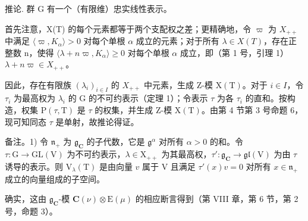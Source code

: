推论. 群 G 有一个（有限维）忠实线性表示。

首先注意，X(T) 的每个元素都等于两个支配权之差；更精确地，令 \(\varpi\) 为 \(X_{++}\) 中满足 \(\langle\varpi,K_{\alpha}\rangle>0\) 对每个单根 \(\alpha\) 成立的元素；对于所有 \(\lambda\in X(T)\)，存在正整数 n，使得 \(\langle\lambda+n\varpi,K_{\alpha}\rangle\geq0\) 对每个单根 \(\alpha\) 成立，即（第 1 号，引理 1）\(\lambda+n\varpi\in X_{++}\)。

因此，存在有限族 \((\lambda_{i})_{i\in I}\) 的 \(X_{++}\) 中元素，生成 Z-模 \(\mathrm{X(T)}\)。对于 \(i\in I\)，令 \(\tau_{i}\) 为最高权为 \(\lambda_{i}\) 的 G 的不可约表示（定理 1）；令表示 \(\tau\) 为各 \(\tau_{i}\) 的直和。按构造，权集 \(\mathrm{P}(\tau,\mathrm{T})\) 是 \(\tau\) 的权集，并生成 Z-模 \(\mathrm{X(T)}\)。由第 4 节第 3 号命题 6，现可知同态 \(\tau\) 是单射，故推论得证。

备注。1) 令 \(\mathfrak{n}_{+}\) 为 \(\mathfrak{g}_{\mathbf{C}}\) 的子代数，它是 \(\mathfrak{g}^{\alpha}\) 对所有 \(\alpha > 0\) 的和。令 \(\tau: \mathrm{G} \to \mathrm{GL}(\mathrm{V})\) 为不可约表示，\(\lambda \in \mathrm{X}_{++}\) 为其最高权，\(\tau': \mathfrak{g}_{\mathbf{C}} \to \mathfrak{gl}(\mathrm{V})\) 为由 \(\tau\) 诱导的表示。则 \(\mathrm{V}_{\lambda}(\mathrm{T})\) 是由向量 \(v\) 属于 \(\mathrm{V}\) 且满足 \(\tau'(x)v = 0\) 对所有 \(x \in \mathfrak{n}_{+}\) 成立的向量组成的子空间。

确实，这由 \(\mathfrak{g}_{\mathbf{C}}\)-模 \(\mathbf{C}(\nu) \otimes \mathrm{E}(\mu)\) 的相应断言得到（第 VIII 章，第 6 节，第 2 号，命题 3）。

